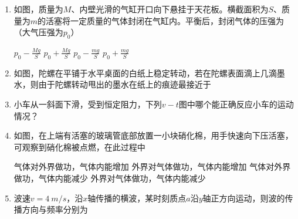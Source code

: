 \begin{enumerate}
\item
如图，质量为$ M $、内壁光滑的气缸开口向下悬挂于天花板。横截面积为$ S $、质量为$ m $的活塞将一定质量的气体封闭在气缸内。平衡后，封闭气体的压强为（大气压强为$ p_{0} $）  
\begin{figure}[h!]
\centering

\end{figure}


\fourchoices
{$p_{0}-\frac{M g}{S}$}
{$p_{0}+\frac{M g}{S}$}
{$p_{0}-\frac{m g}{S}$}
{$p_{0}+\frac{m g}{S}$}



\item
如图，陀螺在平铺于水平桌面的白纸上稳定转动，若在陀螺表面滴上几滴墨水，则由于陀螺转动甩出的墨水在纸上的痕迹最接近于  
\begin{figure}[h!]
\centering

\end{figure}

\pfourchoices
{}
{}
{}
{}






\item
小车从一斜面下滑，受到恒定阻力，下列$ v-t $图中哪个能正确反应小车的运动情况？  

\pfourchoices
{}
{}
{}
{}




\item
如图，在上端有活塞的玻璃管底部放置一小块硝化棉，用手快速向下压活塞，可观察到硝化棉被点燃，在此过程中  
\begin{figure}[h!]
\centering

\end{figure}

\fourchoices
{气体对外界做功，气体内能增加}
{外界对气体做功，气体内能增加}
{气体对外界做功，气体内能减少}
{外界对气体做功，气体内能减少}




\item
波速$ v=4 \ m /s $，沿$ x $轴传播的横波，某时刻质点$ a $沿$ y $轴正方向运动，则波的传播方向与频率分别为  
\begin{figure}[h!]
\centering

\end{figure}


\end{enumerate}

